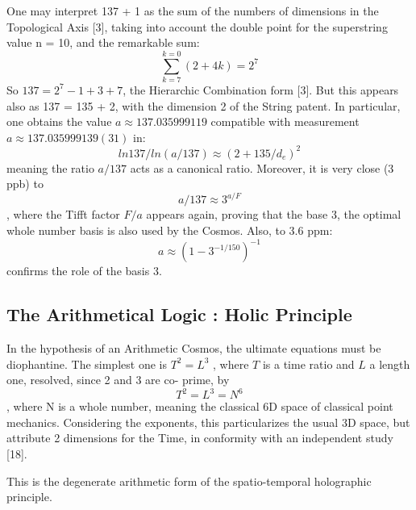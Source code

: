 \documentclass[twoside,draft]{article}
\begin{document}
\begin{sloppypar}
{One may interpret 137 + 1 as
the sum of the numbers of dimensions in the Topological Axis [3], taking into account the double
point for the superstring value n = 10, and the remarkable sum:
\begin{equation}
\sum_{k=7}^{k=0}(2 + 4 k ) = 2^{7}
\end{equation}
So $137 = 2^{7} - 1 + 3 + 7$, the Hierarchic Combination form [3]. But this appears also as 137 = 135 + 2,
with the dimension 2 of the String patent. In particular, one obtains the value $a \approx 137.035999119$
compatible with measurement $a \approx 137.035999139(31)$ in:
\begin{equation}
ln137/ln(a/137) \approx (2+135/d_{e})^{2}
\end{equation}
meaning the ratio $a/137$ acts as a canonical ratio. Moreover, it is very close (3 ppb) to
$$a/137 \approx 3^{a/F}$$,
where the Tifft factor $F/a$ appears again, proving that the base 3, the optimal whole number basis is also used by the Cosmos. Also, to 3.6 ppm:
$$ a \approx (1-3^{-1/150})^{-1}$$
confirms the role of the basis 3.

\subsection{The Arithmetical Logic : Holic Principle}

In the hypothesis of an Arithmetic Cosmos, the ultimate equations must be diophantine. The
simplest one is $T^{2} = L^{3}$ , where $T$ is a time ratio and $L$ a length one, resolved, since 2 and 3 are co-
prime, by $$T^{2} = L^{3} = N^{6}$$, where N is a whole number, meaning the classical 6D space of classical point mechanics. Considering the exponents, this particularizes the usual 3D space, but attribute 2 dimensions for the Time, in conformity with an independent study [18].

This is the degenerate arithmetic form of the spatio-temporal holographic principle.

}
\end{sloppypar}
\end{document}
